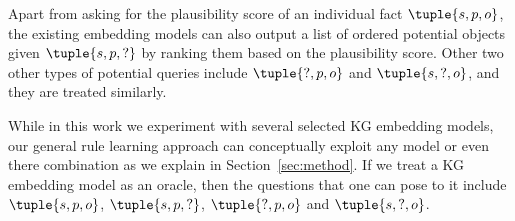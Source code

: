 Apart from asking for the plausibility score of an individual fact $\tuple{s,p,o}$, the existing embedding models can also output a list of ordered potential objects given $\tuple{s,p,?}$ by ranking them based on the plausibility score. Other two other types of potential queries include $\tuple{?,p,o}$ and $\tuple{s,?,o}$, and they are treated similarly.


While in this work we experiment with several selected KG embedding models, our general rule learning approach can conceptually exploit any model or even there combination as we explain in Section~\ref{sec:method}. If we treat a KG embedding model as an oracle, then the questions that one can pose to it include $\tuple{s,p,o}$, $\tuple{s,p,?}$, $\tuple{?,p,o}$ and $\tuple{s,?,o}$.
\begin{example}
\end{example}



